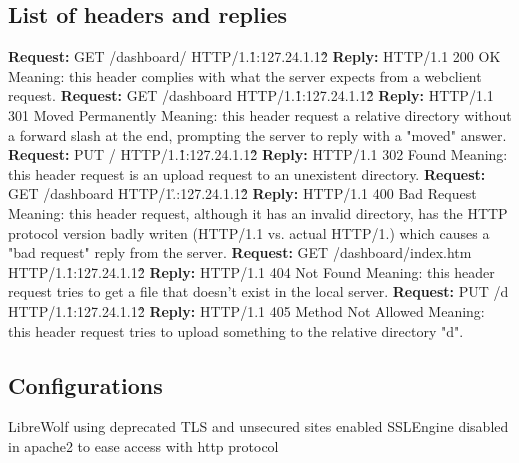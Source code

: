 \documentclass[11pt,a4paper]{report}
\begin{document}
    \subsection{List of headers and replies}
            \textbf{Request:} GET /dashboard/ HTTP/1.1\r\nHost:127.24.1.12\r\n\r\n
            \textbf{Reply:} HTTP/1.1 200 OK
                Meaning: this header complies with what the server expects from a webclient request.
            \textbf{Request:} GET /dashboard HTTP/1.1\r\nHost:127.24.1.12\r\n\r\n
            \textbf{Reply:} HTTP/1.1 301 Moved Permanently
                Meaning: this header request a relative directory without a forward slash at the end, prompting the server to reply with a "moved" answer.
            \textbf{Request:} PUT / HTTP/1.1\r\nHost:127.24.1.12\r\n\r\n
            \textbf{Reply:} HTTP/1.1 302 Found
                Meaning: this header request is an upload request to an unexistent directory.
            \textbf{Request:} GET /dashboard HTTP/1.\r\nHost:127.24.1.12\r\n\r\n
            \textbf{Reply:} HTTP/1.1 400 Bad Request
                Meaning: this header request, although it has an invalid directory, has the HTTP protocol version badly writen (HTTP/1.1 vs. actual HTTP/1.) which causes
                a "bad request" reply from the server.
            \textbf{Request:} GET /dashboard/index.htm HTTP/1.1\r\nHost:127.24.1.12\r\n\r\n
            \textbf{Reply:} HTTP/1.1 404 Not Found
                Meaning: this header request tries to get a file that doesn't exist in the local server.
            \textbf{Request:} PUT /d HTTP/1.1\r\nHost:127.24.1.12\r\n\r\n
            \textbf{Reply:} HTTP/1.1 405 Method Not Allowed
                Meaning: this header request tries to upload something to the relative directory "d".

    \subsection{Configurations}
        LibreWolf using deprecated TLS and unsecured sites enabled
        SSLEngine disabled in apache2 to ease access with http protocol
        
\end{document}
